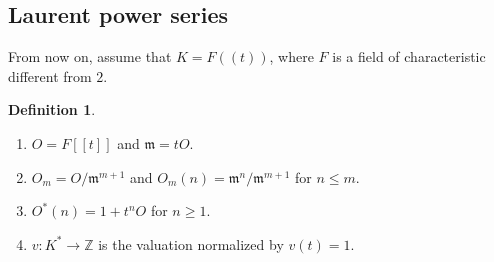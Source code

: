 \documentclass[11pt,a4paper,twoside]{amsart}
\theoremstyle{definition}
\newtheorem{definition}[theorem]{Definition}
\theoremstyle{remark}
\newcommand{\ZZ}{\mathbb Z}
\newcommand{\fm}{\mathfrak m}
\begin{document}
\subsection{Laurent power series}
From now on, assume that $K=F((t))$, where $F$ is a field of characteristic different from $2$.
\begin{definition}\label{intf}
\begin{enumerate}
\item $O=F[[t]]$ and $\fm=tO$.
\item $O_m=O/\fm^{m+1}$ and $O_m(n)=\fm^n/\fm^{m+1}$ for $n\leq m$.
\item $O^*(n)=1+t^nO$ for $n\geq1$.
\item $v:K^*\to\ZZ$ is the valuation normalized by $v(t)=1$.
\end{enumerate}
\end{definition}
\end{document}
